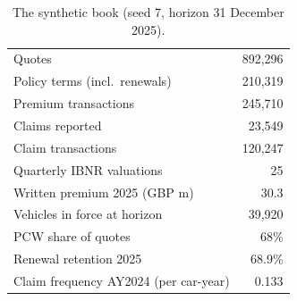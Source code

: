 \begin{table}[t]\centering\small
\caption{The synthetic book (seed 7, horizon 31 December 2025).}\label{tab:book}
\begin{tabular}{lr}\toprule
Quotes & 892,296 \\
Policy terms (incl.\ renewals) & 210,319 \\
Premium transactions & 245,710 \\
Claims reported & 23,549 \\
Claim transactions & 120,247 \\
Quarterly IBNR valuations & 25 \\
Written premium 2025 (GBP m) & 30.3 \\
Vehicles in force at horizon & 39,920 \\
PCW share of quotes & 68\% \\
Renewal retention 2025 & 68.9\% \\
Claim frequency AY2024 (per car-year) & 0.133 \\
\bottomrule\end{tabular}\end{table}
